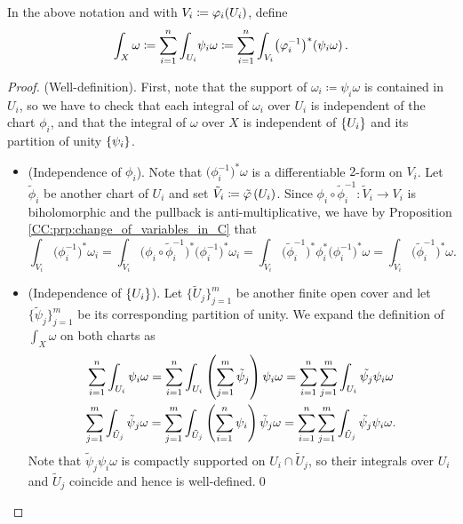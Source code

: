 \documentclass[../Moduli_Spaces_of_Riemann_Surfaces.tex]{subfiles}
\begin{document}
    \begin{defprop}
        In the above notation and with $V_i\coloneqq\varphi_i\!\left(U_i\right)$, define
        \begin{equation*}
            \int_X\omega\coloneqq\sum_{i=1}^{n}\int_{U_i}\!\psi_i\omega\coloneqq\sum_{i=1}^{n}\int_{V_i}\!\big(\varphi_i^{-1}\big)^\ast\!\left(\psi_i\omega\right).
        \end{equation*}
    \end{defprop}
    \begin{proof}
        (Well-definition). First, note that the support of $\omega_i\coloneqq\psi_i\omega$ is contained in $U_i$, so we have to check that each integral of $\omega_i$ over $U_i$ is independent of the chart $\phi_i$, and that the integral of $\omega$ over $X$ is independent of $\left\{U_i\right\}$ and its partition of unity $\left\{\psi_i\right\}$.
        \begin{itemize}
            \item (Independence of $\phi_i$). Note that $\big(\phi_i^{-1}\big)^\ast\omega$ is a differentiable $2$-form on $V_i$. Let $\tilde{\phi}_i$ be another chart of $U_i$ and set $\tilde{V}_i\coloneqq\tilde{\varphi}\left(U_i\right)$. Since $\phi_i\circ\tilde{\phi}_i^{-1}:\tilde{V}_i\to V_i$ is biholomorphic and the pullback is anti-multiplicative, we have by Proposition \ref{CC:prp:change_of_variables_in_C} that
                \begin{equation*}
                    \int_{V_i}\!\big(\phi_i^{-1}\big)^\ast\omega_i=\int_{\tilde{V}_i}\!\big(\phi_i\circ\tilde{\phi}_i^{-1}\big)^\ast\big(\phi_i^{-1}\big)^\ast\omega_i=\int_{\tilde{V}_i}\!\big(\tilde{\phi}_i^{-1}\big)^\ast\phi_i^\ast\big(\phi_i^{-1}\big)^\ast\omega=\int_{\tilde{V}_i}\!\big(\tilde{\phi}_i^{-1}\big)^\ast\omega.
                \end{equation*}
            \item (Independence of $\left\{U_i\right\}$). Let $\big\{\tilde{U}_j\big\}_{j=1}^m$ be another finite open cover and let $\big\{\tilde{\psi}_j\big\}_{j=1}^m$ be its corresponding partition of unity. We expand the definition of $\int_X\omega$ on both charts as
                \begin{equation*}
                    \begin{gathered}
                        \sum_{i=1}^{n}\int_{U_i}\psi_i\omega=\sum_{i=1}^{n}\int_{U_i}\left(\sum_{j=1}^{m}\tilde{\psi}_j\right)\psi_i\omega=\sum_{i=1}^{n}\sum_{j=1}^{m}\int_{U_i}\tilde{\psi_j}\psi_i\omega \\
                        \sum_{j=1}^{m}\int_{\tilde{U}_j}\tilde{\psi}_j\omega=\sum_{j=1}^{m}\int_{\tilde{U}_j}\left(\sum_{i=1}^{n}\psi_i\right)\tilde{\psi}_j\omega=\sum_{i=1}^{n}\sum_{j=1}^{m}\int_{\tilde{U}_j}\tilde{\psi_j}\psi_i\omega.
                    \end{gathered}
                \end{equation*}
                Note that $\tilde{\psi}_j\psi_i\omega$ is compactly supported on $U_i\cap\tilde{U}_j$, so their integrals over $U_i$ and $\tilde{U}_j$ coincide and hence is well-defined.\qed
        \end{itemize}
    \end{proof}
\end{document}
